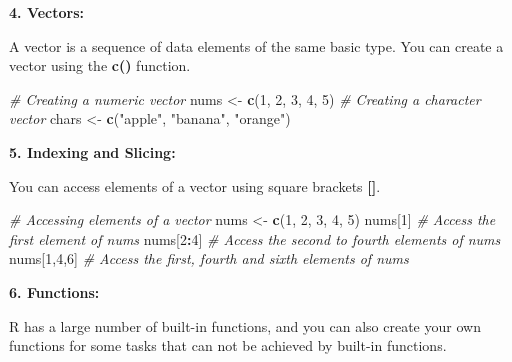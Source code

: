 \documentclass[
]{book}
\newenvironment{Shaded}{\begin{snugshade}}{\end{snugshade}}
\newcommand{\CommentTok}[1]{\textcolor[rgb]{0.56,0.35,0.01}{\textit{#1}}}
\newcommand{\DecValTok}[1]{\textcolor[rgb]{0.00,0.00,0.81}{#1}}
\newcommand{\FunctionTok}[1]{\textcolor[rgb]{0.13,0.29,0.53}{\textbf{#1}}}
\newcommand{\NormalTok}[1]{#1}
\newcommand{\OtherTok}[1]{\textcolor[rgb]{0.56,0.35,0.01}{#1}}
\newcommand{\SpecialCharTok}[1]{\textcolor[rgb]{0.81,0.36,0.00}{\textbf{#1}}}
\newcommand{\StringTok}[1]{\textcolor[rgb]{0.31,0.60,0.02}{#1}}
\begin{document}
\textbf{4. Vectors:}

A vector is a sequence of data elements of the same basic type. You can create a vector using the \textbf{c()} function.

\begin{Shaded}
\begin{Highlighting}[]
\CommentTok{\# Creating a numeric vector}
\NormalTok{nums }\OtherTok{\textless{}{-}} \FunctionTok{c}\NormalTok{(}\DecValTok{1}\NormalTok{, }\DecValTok{2}\NormalTok{, }\DecValTok{3}\NormalTok{, }\DecValTok{4}\NormalTok{, }\DecValTok{5}\NormalTok{)}
\CommentTok{\# Creating a character vector}
\NormalTok{chars }\OtherTok{\textless{}{-}} \FunctionTok{c}\NormalTok{(}\StringTok{"apple"}\NormalTok{, }\StringTok{"banana"}\NormalTok{, }\StringTok{"orange"}\NormalTok{)}
\end{Highlighting}
\end{Shaded}

\textbf{5. Indexing and Slicing:}

You can access elements of a vector using square brackets \textbf{{[}{]}}.

\begin{Shaded}
\begin{Highlighting}[]
\CommentTok{\# Accessing elements of a vector}
\NormalTok{nums }\OtherTok{\textless{}{-}} \FunctionTok{c}\NormalTok{(}\DecValTok{1}\NormalTok{, }\DecValTok{2}\NormalTok{, }\DecValTok{3}\NormalTok{, }\DecValTok{4}\NormalTok{, }\DecValTok{5}\NormalTok{)}
\NormalTok{nums[}\DecValTok{1}\NormalTok{]   }\CommentTok{\# Access the first element of nums}
\NormalTok{nums[}\DecValTok{2}\SpecialCharTok{:}\DecValTok{4}\NormalTok{] }\CommentTok{\# Access the second to fourth elements of nums}
\NormalTok{nums[}\DecValTok{1}\NormalTok{,}\DecValTok{4}\NormalTok{,}\DecValTok{6}\NormalTok{] }\CommentTok{\# Access the first, fourth and sixth elements of nums}
\end{Highlighting}
\end{Shaded}

\textbf{6. Functions:}

R has a large number of built-in functions, and you can also create your own functions for some tasks that can not be achieved by built-in functions.
\end{document}
